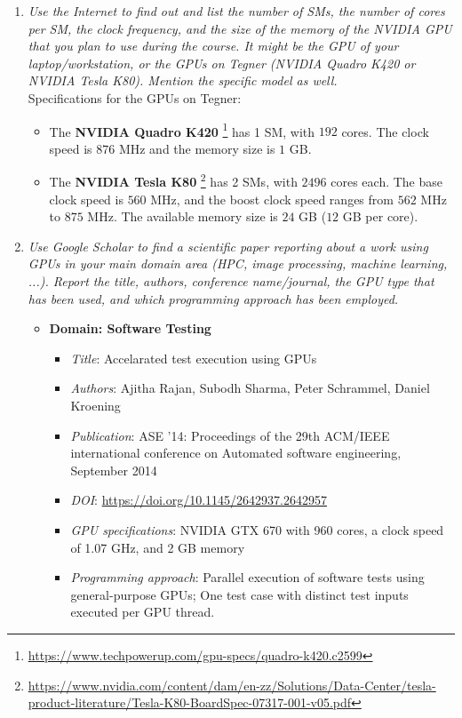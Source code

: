 \documentclass[12pt]{article}
\begin{document}
\begin{enumerate}
    \item\textit{Use the Internet to find out and list the number of SMs, the number of cores per SM, the clock frequency, and the size of the memory of the NVIDIA GPU that you plan to use during the course. It might be the GPU of your laptop/workstation, or the GPUs on Tegner (NVIDIA Quadro K420 or NVIDIA Tesla K80). Mention the specific model as well.}\\
    Specifications for the GPUs on Tegner:
    \begin{itemize}
        \item The \textbf{NVIDIA Quadro K420} \footnote{\url{https://www.techpowerup.com/gpu-specs/quadro-k420.c2599}} has 1 SM, with $192$ cores. The clock speed is $876$ MHz and the memory size is $1$ GB.
        \item The \textbf{NVIDIA Tesla K80} \footnote{\url{https://www.nvidia.com/content/dam/en-zz/Solutions/Data-Center/tesla-product-literature/Tesla-K80-BoardSpec-07317-001-v05.pdf}} has 2 SMs, with $2496$ cores each. The base clock speed is $560$ MHz, and the boost clock speed ranges from $562$ MHz to $875$ MHz. The available memory size is  $24$ GB ($12$ GB per core).
    \end{itemize}
    
    \item \textit{Use Google Scholar to find a scientific paper reporting about a work using GPUs in your main domain area (HPC, image processing, machine learning, ...). Report the title, authors, conference name/journal, the GPU type that has been used, and which programming approach has been employed.}
    \begin{itemize}
        \item \textbf{Domain: Software Testing}
        \begin{itemize}
            \item \textit{Title}: Accelarated test execution using GPUs
            \item \textit{Authors}: Ajitha  Rajan, Subodh  Sharma, Peter  Schrammel, Daniel Kroening
            \item \textit{Publication}: ASE '14: Proceedings of the 29th ACM/IEEE international conference on Automated software engineering, September 2014
            \item \textit{DOI}: \url{https://doi.org/10.1145/2642937.2642957}
            \item \textit{GPU specifications}: NVIDIA GTX 670 with 960 cores, a clock speed of 1.07 GHz, and 2 GB memory
            \item \textit{Programming approach}: Parallel execution of software tests  using general-purpose GPUs; One test case with distinct test inputs executed per GPU thread.
        \end{itemize}
      

\end{itemize}
\end{enumerate}
\end{document}
